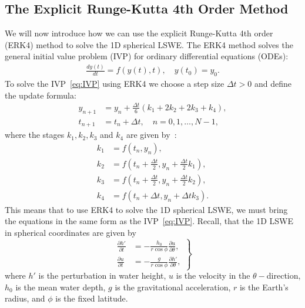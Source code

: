\subsection*{The Explicit Runge-Kutta 4th Order Method}
We will now introduce how we can use the explicit Runge-Kutta 4th order (ERK4) method to solve the 1D spherical LSWE.
The ERK4 method solves the general initial value problem (IVP) for ordinary differential equations (ODEs):
\begin{align}\label{eq:IVP}
    \frac{d y(t)}{dt} = f(y(t), t), \quad y(t_0) = y_0.
\end{align}
To solve the IVP~\eqref{eq:IVP} using ERK4 we choose a step size $\Delta t > 0$ and define the update formula:
\begin{subequations}
    \begin{align*}
        y_{n+1} &= y_n + \frac{\Delta t}{6} (k_1 + 2k_2 + 2k_3 + k_4), \\
        t_{n+1} &= t_n + \Delta t,     \quad n = 0,1, \dots, N-1,
    \end{align*}
\end{subequations}
where the stages $k_1, k_2, k_3$ and $k_4$ are given by~\cite{RK4}:
\begin{subequations}
    \begin{align*}
        k_1 &= f(t_n, y_n), \\
        k_2 &= f(t_n + \frac{\Delta t}{2}, y_n + \frac{\Delta t}{2} k_1), \\
        k_3 &= f(t_n + \frac{\Delta t}{2}, y_n + \frac{\Delta t}{2} k_2), \\
        k_4 &= f(t_n + \Delta t, y_n + \Delta t k_3).
    \end{align*}
\end{subequations}
This means that to use ERK4 to solve the 1D spherical LSWE, we must bring the equations in the same form as the IVP~\eqref{eq:IVP}.
Recall, that the 1D LSWE in spherical coordinates are given by
\begin{equation}\label{eq:linearized_LSWE_spherical}
    \left.
    \begin{aligned}
        \frac{\partial h'}{\partial t} &= -\frac{h_0}{r \cos\phi} \frac{\partial u}{\partial \theta}, \\
        \frac{\partial u}{\partial t} &= -\frac{g}{r \cos\phi}  \frac{\partial h'}{\partial \theta}, 
    \end{aligned}
    \right\}
\end{equation}
where $h'$ is the perturbation in water height, $u$ is the velocity in the $\theta-$direction, $h_0$ is the mean water depth, $g$ is the gravitational acceleration, $r$ is the Earth's radius, and $\phi$ is the fixed latitude.
